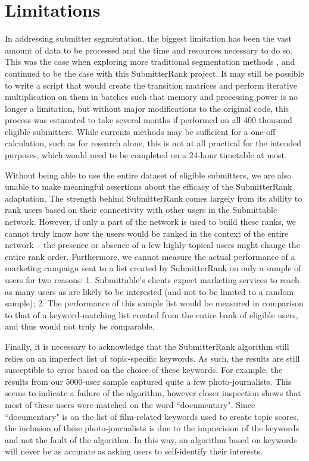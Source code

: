\documentclass[12pt]{report}   %
\begin{document}
\section{Limitations}

In addressing submitter segmentation, the biggest limitation has been the vast amount of data to be processed and the time and resources necessary to do so. This was the case when exploring more traditional segmentation methods \cite{marbut_2018}, and continued to be the case with this SubmitterRank project. It may still be possible to write a script that would create the transition matrices and perform iterative multiplication on them in batches such that memory and processing power is no longer a limitation, but without major modifications to the original code, this process was estimated to take several months if performed on all 400 thousand eligible submitters. While currents methods may be sufficient for a one-off calculation, such as for research alone, this is not at all practical for the intended purposes, which would need to be completed on a 24-hour timetable at most.

Without being able to use the entire dataset of eligible submitters, we are also unable to make meaningful assertions about the efficacy of the SubmitterRank adaptation. The strength behind SubmitterRank comes largely from its ability to rank users based on their connectivity with other users in the Submittable network. However, if only a part of the network is used to build these ranks, we cannot truly know how the users would be ranked in the context of the entire network -- the presence or absence of a few highly topical users might change the entire rank order. Furthermore, we cannot measure the actual performance of a marketing campaign sent to a list created by SubmitterRank on only a sample of users for two reasons: 1. Submittable's clients expect marketing services to reach as many users as are likely to be interested (and not to be limited to a random sample); 2. The performance of this sample list would be measured in comparison to that of a keyword-matching list created from the entire bank of eligible users, and thus would not truly be comparable.

Finally, it is necessary to acknowledge that the SubmitterRank algorithm still relies on an imperfect list of topic-specific keywords. As such, the results are still susceptible to error based on the choice of these keywords. For example, the results from our 5000-user sample captured quite a few photo-journalists. This seems to indicate a failure of the algorithm, however closer inspection shows that most of these users  were matched on the word ``documentary". Since ``documentary" is on the list of film-related keywords used to create topic scores, the inclusion of these photo-journalists is due to the imprecision of the keywords and not the fault of the algorithm. In this way, an algorithm based on keywords will never be as accurate as asking users to self-identify their interests.
    
\end{document}
